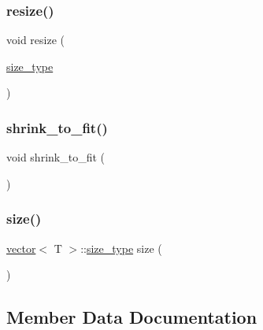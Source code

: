 \mbox{\label{classvector_add2eb5b04f92dc2f8aff3d32b42fb59d}} 
\subsubsection{\texorpdfstring{resize()}{resize()}}
{\footnotesize\ttfamily void resize (\begin{DoxyParamCaption}\item[{\mbox{\hyperlink{classvector_ada51e68d31936547d3729c82daf6b7c6}{size\+\_\+type}}}]{ }\end{DoxyParamCaption})}

\mbox{\label{classvector_a5f16304f80b6fb253c7b0ead3e16dd18}} 
\subsubsection{\texorpdfstring{shrink\+\_\+to\+\_\+fit()}{shrink\_to\_fit()}}
{\footnotesize\ttfamily void shrink\+\_\+to\+\_\+fit (\begin{DoxyParamCaption}{ }\end{DoxyParamCaption})}

\mbox{\label{classvector_a9428b380b615c7bce6df24117d5b1000}} 
\subsubsection{\texorpdfstring{size()}{size()}}
{\footnotesize\ttfamily \mbox{\hyperlink{classvector}{vector}}$<$ T $>$\+::\mbox{\hyperlink{classvector_ada51e68d31936547d3729c82daf6b7c6}{size\+\_\+type}} size (\begin{DoxyParamCaption}{ }\end{DoxyParamCaption})}



\subsection{Member Data Documentation}
\mbox{\label{classvector_a146e9e7358f9c0ad7b78c73519623f6c}} 
